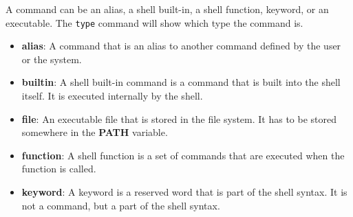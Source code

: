 \begin{definition}
  A command can be an alias, a shell built-in, a shell function, keyword, or an executable.
  The \texttt{type} command will show which type the command is.
  \begin{itemize}
    \item \textbf{alias}: A command that is an alias to another command defined
    by the user or the system.
    \item \textbf{builtin}: A shell built-in command is a command that is built
    into the shell itself. It is executed internally by the shell.
    \item \textbf{file}: An executable file that is stored in the file system.
      It has to be stored somewhere in the \textbf{PATH} variable.
    \item \textbf{function}: A shell function is a set of commands that are
    executed when the function is called.
    \item \textbf{keyword}: A keyword is a reserved word that is part of the shell
    syntax. It is not a command, but a part of the shell syntax.
  \end{itemize}
\end{definition}

